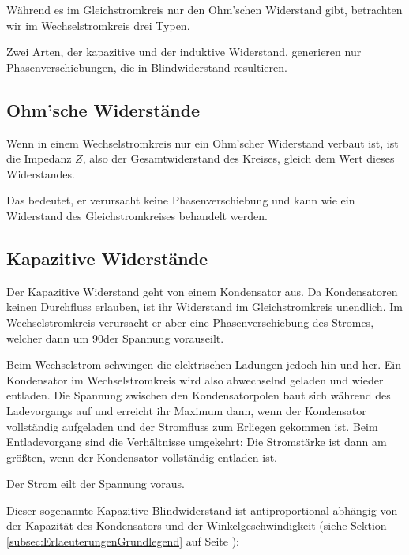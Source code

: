 

Während es im Gleichstromkreis nur den Ohm'schen Widerstand gibt, betrachten wir im Wechselstromkreis drei Typen.

Zwei Arten, der kapazitive und der induktive Widerstand, generieren nur Phasenverschiebungen, die in Blindwiderstand resultieren.


\subsection{Ohm'sche Widerstände}		\label{subsec:OhmscherWiderstand}

Wenn in einem Wechselstromkreis nur ein Ohm'scher Widerstand verbaut ist, ist die Impedanz $Z$, also der Gesamtwiderstand des Kreises, gleich dem Wert dieses Widerstandes.

Das bedeutet, er verursacht keine Phasenverschiebung und kann wie ein Widerstand des Gleichstromkreises behandelt werden.


\subsection{Kapazitive Widerstände}		\label{subsec:KapazitiverWiderstand}

Der Kapazitive Widerstand geht von einem Kondensator aus. Da Kondensatoren keinen Durchfluss erlauben, ist ihr Widerstand im Gleichstromkreis unendlich. Im Wechselstromkreis verursacht er aber eine Phasenverschiebung des Stromes, welcher dann um 90\degree der Spannung vorauseilt.

Beim Wechselstrom schwingen die elektrischen Ladungen jedoch hin und her. Ein Kondensator im Wechselstromkreis wird also abwechselnd geladen und wieder entladen. Die Spannung zwischen den Kondensatorpolen baut sich während des Ladevorgangs auf und erreicht ihr Maximum dann, wenn der Kondensator vollständig aufgeladen und der Stromfluss zum Erliegen gekommen ist. Beim Entladevorgang sind die Verhältnisse umgekehrt: Die Stromstärke ist dann am größten, wenn der Kondensator vollständig entladen ist. \footnotemark


\glqq Der Strom eilt der Spannung voraus.\grqq

\vspace{11pt}

Dieser sogenannte \glqq Kapazitive Blindwiderstand\grqq{} ist antiproportional abhängig von der Kapazität des Kondensators und der Winkelgeschwindigkeit (siehe Sektion \ref{subsec:ErlaeuterungenGrundlegend} auf Seite \pageref{subsec:ErlaeuterungenGrundlegend}):

